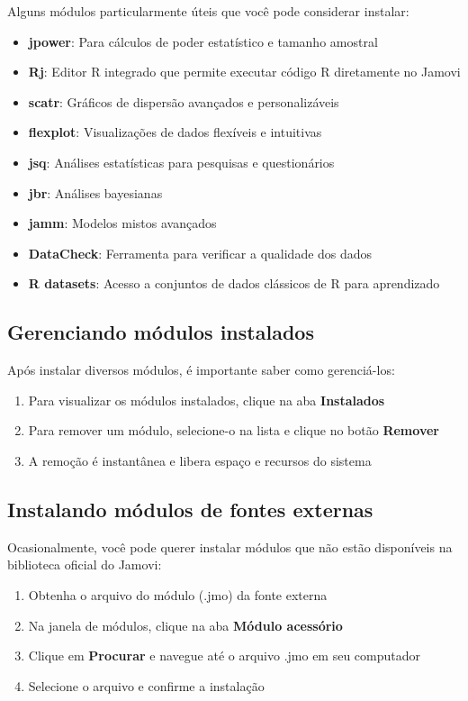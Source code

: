 Alguns módulos particularmente úteis que você pode considerar instalar:

\begin{itemize}
    \item \textbf{jpower}: Para cálculos de poder estatístico e tamanho amostral
    \item \textbf{Rj}: Editor R integrado que permite executar código R diretamente no Jamovi
    \item \textbf{scatr}: Gráficos de dispersão avançados e personalizáveis
    \item \textbf{flexplot}: Visualizações de dados flexíveis e intuitivas
    \item \textbf{jsq}: Análises estatísticas para pesquisas e questionários
    \item \textbf{jbr}: Análises bayesianas
    \item \textbf{jamm}: Modelos mistos avançados
    \item \textbf{DataCheck}: Ferramenta para verificar a qualidade dos dados
    \item \textbf{R datasets}: Acesso a conjuntos de dados clássicos de R para aprendizado
\end{itemize}

\subsection{Gerenciando módulos instalados}

Após instalar diversos módulos, é importante saber como gerenciá-los:

\begin{enumerate}
    \item Para visualizar os módulos instalados, clique na aba \textbf{Instalados}
    \item Para remover um módulo, selecione-o na lista e clique no botão \textbf{Remover}
    \item A remoção é instantânea e libera espaço e recursos do sistema
\end{enumerate}

\subsection{Instalando módulos de fontes externas}

Ocasionalmente, você pode querer instalar módulos que não estão disponíveis na biblioteca oficial do Jamovi:

\begin{enumerate}
    \item Obtenha o arquivo do módulo (.jmo) da fonte externa
    \item Na janela de módulos, clique na aba \textbf{Módulo acessório}
    \item Clique em \textbf{Procurar} e navegue até o arquivo .jmo em seu computador
    \item Selecione o arquivo e confirme a instalação
\end{enumerate}

